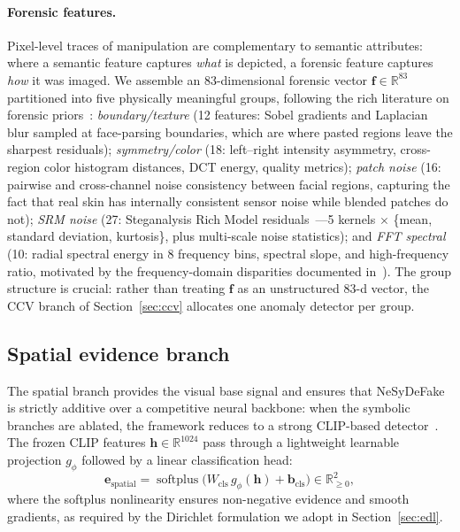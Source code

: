 \documentclass{article}
\begin{document}
\paragraph{Forensic features.}
Pixel-level traces of manipulation are complementary to semantic attributes: where a semantic feature captures \emph{what} is depicted, a forensic feature captures \emph{how} it was imaged. We assemble an 83-dimensional forensic vector $\bm{f} \in \mathbb{R}^{83}$ partitioned into five physically meaningful groups, following the rich literature on forensic priors~\citep{fridrich2012rich,luo2021generalizing,qian2020thinking}: \emph{boundary/texture} (12 features: Sobel gradients and Laplacian blur sampled at face-parsing boundaries, which are where pasted regions leave the sharpest residuals); \emph{symmetry/color} (18: left--right intensity asymmetry, cross-region color histogram distances, DCT energy, quality metrics); \emph{patch noise} (16: pairwise and cross-channel noise consistency between facial regions, capturing the fact that real skin has internally consistent sensor noise while blended patches do not); \emph{SRM noise} (27: Steganalysis Rich Model residuals~\citep{fridrich2012rich}---5 kernels $\times$ \{mean, standard deviation, kurtosis\}, plus multi-scale noise statistics); and \emph{FFT spectral} (10: radial spectral energy in 8 frequency bins, spectral slope, and high-frequency ratio, motivated by the frequency-domain disparities documented in~\citealp{qian2020thinking,li2024freqblender}). The group structure is crucial: rather than treating $\bm{f}$ as an unstructured 83-d vector, the CCV branch of Section~\ref{sec:ccv} allocates one anomaly detector per group.


\subsection{Spatial evidence branch}
\label{sec:spatial}

The spatial branch provides the visual base signal and ensures that NeSyDeFake is strictly additive over a competitive neural backbone: when the symbolic branches are ablated, the framework reduces to a strong CLIP-based detector~\citep{gend,ojha2023towards}. The frozen CLIP features $\bm{h} \in \mathbb{R}^{1024}$ pass through a lightweight learnable projection $g_\phi$ followed by a linear classification head:
\begin{equation}
  \bm{e}_\text{spatial} = \operatorname{softplus}\bigl(W_\text{cls}\, g_\phi(\bm{h}) + \bm{b}_\text{cls}\bigr) \in \mathbb{R}^{2}_{\geq 0},
  \label{eq:spatial_evidence}
\end{equation}
where the softplus nonlinearity ensures non-negative evidence and smooth gradients, as required by the Dirichlet formulation we adopt in Section~\ref{sec:edl}.
\end{document}
